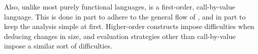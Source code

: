 Also, unlike most purely functional languages, \D{} is a first-order,
call-by-value language. This is done in part to adhere to the general flow of
\cite{size-change}, and in part to keep the analysis simple at first.
Higher-order constructs impose difficulties when deducing changes in size, and
evaluation strategies other than call-by-value impose a similar sort of
difficulties.







